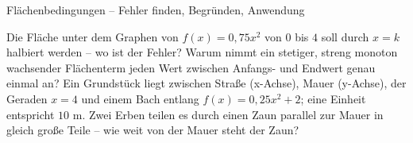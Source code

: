 \begin{aufgabe}{Flächenbedingungen – Fehler finden, Begründen, Anwendung}
\begin{teile}
\teil Die Fläche unter dem Graphen von $f(x) = 0{,}75x^2$ von $0$ bis $4$ soll durch $x = k$ halbiert werden – wo ist der Fehler? 
\teil Warum nimmt ein stetiger, streng monoton wachsender Flächenterm jeden Wert zwischen Anfangs- und Endwert genau einmal an?
\teil Ein Grundstück liegt zwischen Straße (x-Achse), Mauer (y-Achse), der Geraden $x = 4$ und einem Bach entlang $f(x) = 0{,}25x^2 + 2$; eine Einheit entspricht $10$ m. Zwei Erben teilen es durch einen Zaun parallel zur Mauer in gleich große Teile – wie weit von der Mauer steht der Zaun?
\end{teile}
\end{aufgabe}
